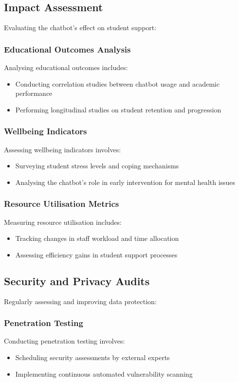 \documentclass[15pt,a4paper]{article}
\begin{document}
\begin{multicols}{2}
\subsection{Impact Assessment}
Evaluating the chatbot's effect on student support:

\subsubsection*{Educational Outcomes Analysis}
Analysing educational outcomes \textit{\parencite{Sclater2023}} includes:
\begin{itemize}
    \item Conducting correlation studies between chatbot usage and academic performance
    \item Performing longitudinal studies on student retention and progression
\end{itemize}

\subsubsection*{Wellbeing Indicators}
Assessing wellbeing indicators \textit{\parencite[pp. 100-150]{Diener2024}} involves:
\begin{itemize}
    \item Surveying student stress levels and coping mechanisms
    \item Analysing the chatbot's role in early intervention for mental health issues
\end{itemize}

\subsubsection*{Resource Utilisation Metrics}
Measuring resource utilisation \textit{\parencite{Heick2023}} includes:
\begin{itemize}
    \item Tracking changes in staff workload and time allocation
    \item Assessing efficiency gains in student support processes
\end{itemize}

\subsection{Security and Privacy Audits}
Regularly assessing and improving data protection:

\subsubsection*{Penetration Testing}
Conducting penetration testing \textit{\parencite[pp. 200-250]{StuttardPinto2023}} involves:
\begin{itemize}
    \item Scheduling security assessments by external experts
    \item Implementing continuous automated vulnerability scanning
\end{itemize}


\end{multicols}
\end{document}
